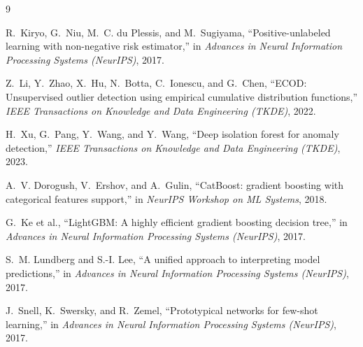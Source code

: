 \documentclass{article}
\begin{document}
\begin{thebibliography}{9}

R.~Kiryo, G.~Niu, M.~C. du Plessis, and M.~Sugiyama,
``Positive-unlabeled learning with non-negative risk estimator,''
in \emph{Advances in Neural Information Processing Systems (NeurIPS)}, 2017.

Z.~Li, Y.~Zhao, X.~Hu, N.~Botta, C.~Ionescu, and G.~Chen,
``ECOD: Unsupervised outlier detection using empirical cumulative distribution functions,''
\emph{IEEE Transactions on Knowledge and Data Engineering (TKDE)}, 2022.

H.~Xu, G.~Pang, Y.~Wang, and Y.~Wang,
``Deep isolation forest for anomaly detection,''
\emph{IEEE Transactions on Knowledge and Data Engineering (TKDE)}, 2023.

A.~V. Dorogush, V.~Ershov, and A.~Gulin,
``CatBoost: gradient boosting with categorical features support,''
in \emph{NeurIPS Workshop on ML Systems}, 2018.

G.~Ke et al.,
``LightGBM: A highly efficient gradient boosting decision tree,''
in \emph{Advances in Neural Information Processing Systems (NeurIPS)}, 2017.

S.~M. Lundberg and S.-I. Lee,
``A unified approach to interpreting model predictions,''
in \emph{Advances in Neural Information Processing Systems (NeurIPS)}, 2017.

J.~Snell, K.~Swersky, and R.~Zemel,
``Prototypical networks for few-shot learning,''
in \emph{Advances in Neural Information Processing Systems (NeurIPS)}, 2017.

\end{thebibliography}
\end{document}
